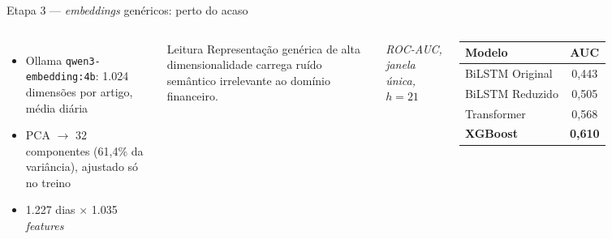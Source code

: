 \documentclass[11pt,aspectratio=169]{beamer}
\begin{document}
\begin{frame}{Etapa 3 --- \textit{embeddings} genéricos: perto do acaso}
  \begin{columns}[T]
    \begin{itemize}
      \item Ollama \texttt{qwen3-embedding:4b}: 1.024 dimensões por artigo, média diária
      \item PCA $\to$ 32 componentes (61{,}4\% da variância), ajustado só no treino
      \item 1.227 dias $\times$ 1.035 \textit{features}
    \end{itemize}
    \vspace{1ex}
    \begin{block}{Leitura}
      Representação genérica de alta dimensionalidade carrega ruído
      semântico irrelevante ao domínio financeiro.
    \end{block}
    \begin{table}
      \footnotesize
      {\scriptsize\itshape ROC-AUC, janela única, $h=21$}\\[0.5ex]
      \begin{tabular}{lc}
        \toprule
        \textbf{Modelo} & \textbf{AUC} \\
        \midrule
        BiLSTM Original & 0{,}443 \\
        BiLSTM Reduzido & 0{,}505 \\
        Transformer     & 0{,}568 \\
        \textbf{XGBoost} & \textbf{0{,}610} \\
        \bottomrule
      \end{tabular}
    \end{table}
  \end{columns}
\end{frame}
\end{document}
